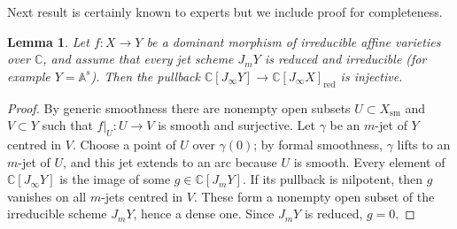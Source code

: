 \documentclass[11pt]{amsart}
\newtheorem{lemma}[theorem]{Lemma}
\theoremstyle{definition}
\theoremstyle{remark}
\newcommand{\C}{\mathbb C}
\newcommand{\J}{J_\infty}
\begin{document}
Next result is certainly known to experts but we include proof for completeness.
\begin{lemma}\label{lem:arc-dominance}
Let $f\colon X\to Y$ be a dominant morphism of irreducible affine varieties over $\mathbb C$,
and assume that every jet scheme $J_mY$ is reduced and irreducible (for example $Y=\mathbb A^s$).
Then the pullback $\mathbb C[J_\infty Y]\to\mathbb C[J_\infty X]_{\mathrm{red}}$ is injective.
\end{lemma}
\begin{proof}
By generic smoothness there are nonempty open subsets $U\subset X_{\mathrm{sm}}$ and $V\subset Y$
such that $f|_U\colon U\to V$ is smooth and surjective. Let $\gamma$ be an $m$-jet of $Y$ centred
in $V$. Choose a point of $U$ over $\gamma(0)$; by formal smoothness, $\gamma$ lifts to an $m$-jet
of $U$, and this jet extends to an arc because $U$ is smooth. Every element of
$\mathbb C[J_\infty Y]$ is the image of some $g\in\mathbb C[J_mY]$. If its pullback is nilpotent,
then $g$ vanishes on all $m$-jets centred in $V$. These form a nonempty open subset of the
irreducible scheme $J_mY$, hence a dense one. Since $J_mY$ is reduced, $g=0$.
\end{proof}


\color{black}
\end{document}
